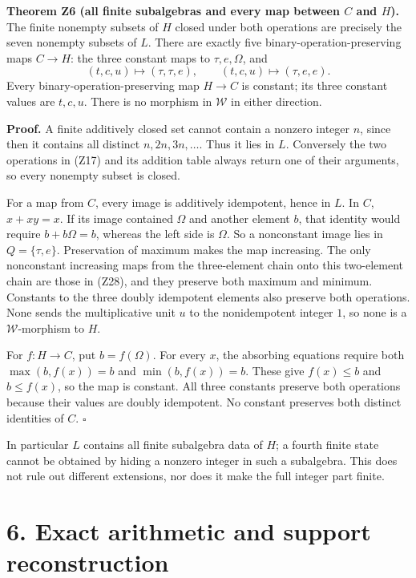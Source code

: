 \documentclass[
]{article}
\newcounter{none} %
\begin{document}
\textbf{Theorem Z6 (all finite subalgebras and every map between \(C\)
and \(H\)).} The finite nonempty subsets of \(H\) closed under both
operations are precisely the seven nonempty subsets of \(L\). There are
exactly five binary-operation-preserving maps \(C\to H\): the three
constant maps to \(\tau,e,\Omega\), and \[
(t,c,u)\mapsto(\tau,\tau,e),\qquad
(t,c,u)\mapsto(\tau,e,e).
\tag{Z28}
\] Every binary-operation-preserving map \(H\to C\) is constant; its
three constant values are \(t,c,u\). There is no morphism in
\(\mathcal W\) in either direction.

\textbf{Proof.} A finite additively closed set cannot contain a nonzero
integer \(n\), since then it contains all distinct \(n,2n,3n,\ldots\).
Thus it lies in \(L\). Conversely the two operations in (Z17) and its
addition table always return one of their arguments, so every nonempty
subset is closed.

For a map from \(C\), every image is additively idempotent, hence in
\(L\). In \(C\), \(x+xy=x\). If its image contained \(\Omega\) and
another element \(b\), that identity would require \(b+b\Omega=b\),
whereas the left side is \(\Omega\). So a nonconstant image lies in
\(Q=\{\tau,e\}\). Preservation of maximum makes the map increasing. The
only nonconstant increasing maps from the three-element chain onto this
two-element chain are those in (Z28), and they preserve both maximum and
minimum. Constants to the three doubly idempotent elements also preserve
both operations. None sends the multiplicative unit \(u\) to the
nonidempotent integer \(1\), so none is a \(\mathcal W\)-morphism to
\(H\).

For \(f:H\to C\), put \(b=f(\Omega)\). For every \(x\), the absorbing
equations require both \(\max(b,f(x))=b\) and \(\min(b,f(x))=b\). These
give \(f(x)\le b\) and \(b\le f(x)\), so the map is constant. All three
constants preserve both operations because their values are doubly
idempotent. No constant preserves both distinct identities of \(C\).
\(\square\)

In particular \(L\) contains all finite subalgebra data of \(H\); a
fourth finite state cannot be obtained by hiding a nonzero integer in
such a subalgebra. This does not rule out different extensions, nor does
it make the full integer part finite.

\section{6. Exact arithmetic and support
reconstruction}\label{exact-arithmetic-and-support-reconstruction}
\end{document}
